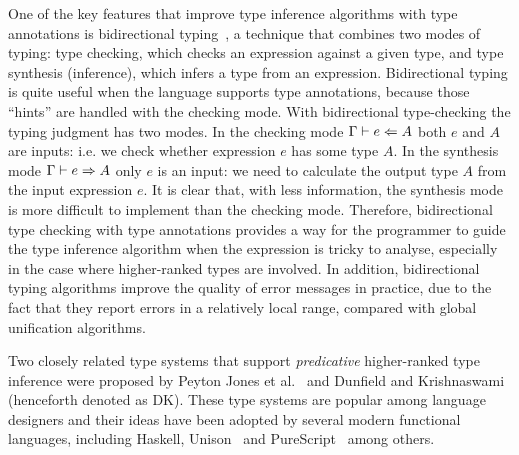 One of the key features that improve type inference algorithms with type annotations
is bidirectional typing~\citep{pierce:local}, a technique that combines two modes of typing:
type checking, which checks an expression against a given type,
and type synthesis (inference), which infers a type from an expression.
Bidirectional typing is quite useful when the language supports type annotations,
because those ``hints'' are handled with the checking mode.
With bidirectional type-checking the typing judgment has two modes.
In the checking mode $\Gamma \vdash e \Leftarrow A$ both $e$ and $A$ are inputs:
i.e. we check whether expression $e$ has some type $A$.
In the synthesis mode $\Gamma \vdash e \Rightarrow A$ only $e$ is an input:
we need to calculate the output type $A$ from the input expression $e$.
It is clear that, with less information,
the synthesis mode is more difficult to implement than the checking mode.
Therefore, bidirectional type checking with type annotations
provides a way for the programmer to guide
the type inference algorithm when the expression is tricky to analyse,
especially in the case where higher-ranked types are involved.
In addition, bidirectional typing algorithms
improve the quality of error messages in practice,
due to the fact that they report errors in a relatively local range,
compared with global unification algorithms.

Two closely related type systems that 
support \emph{predicative} higher-ranked type inference were proposed 
by Peyton Jones et al.~\citep{jones2007practical} and Dunfield and
Krishnaswami~\citep{dunfield2013complete} (henceforth denoted as DK). 
These type systems are
popular among language designers and their ideas have been adopted by
several modern functional languages, including Haskell,
Unison~\citep{Unison} and PureScript~\citep{PureScript} among others.

